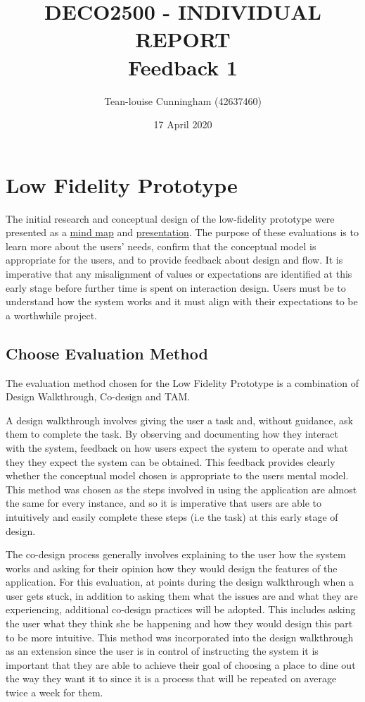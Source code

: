 \documentclass[a4 paper, 12pt]{article}
\title{DECO2500 - INDIVIDUAL REPORT \\ Feedback 1}
\author{Tean-louise Cunningham (42637460)}
\date{17 April 2020}
\begin{document}
\section{Low Fidelity Prototype}
The initial research and conceptual design of the low-fidelity prototype were presented as a \href{run:./MindMap.pdf}{mind map} and \href{https://youtu.be/BRX7kF7ynSQ}{presentation}. The purpose of these evaluations is to learn more about the users' needs, confirm that the conceptual model is appropriate for the users, and to provide feedback about design and flow. It is imperative that any misalignment of values or expectations are identified at this early stage before further time is spent on interaction design. Users must be to understand how the system works and it must align with their expectations to be a worthwhile project.

\subsection{Choose Evaluation Method}
The evaluation method chosen for the Low Fidelity Prototype is a combination of Design Walkthrough, Co-design and TAM.

A design walkthrough involves giving the user a task and, without guidance, ask them to complete the task. By observing and documenting how they interact with the system, feedback on how users expect the system to operate and what they they expect the system can be obtained. This feedback provides clearly whether the conceptual model chosen is appropriate to the users mental model. This method was chosen as the steps involved in using the application are almost the same for every instance, and so it is imperative that users are able to intuitively and easily complete these steps (i.e the task) at this early stage of design.

The co-design process generally involves explaining to the user how the system works and asking for their opinion how they would design the features of the application. For this evaluation, at points during the design walkthrough when a user gets stuck, in addition to asking them what the issues are and what they are experiencing, additional co-design practices will be adopted. This includes asking the user what they think she be happening and how they would design this part to be more intuitive. This method was incorporated into the design walkthrough as an extension since the user is in control of instructing the system it is important that they are able to achieve their goal of choosing a place to dine out the way they want it to since it is a process that will be repeated on average twice a week for them. 
\end{document}
